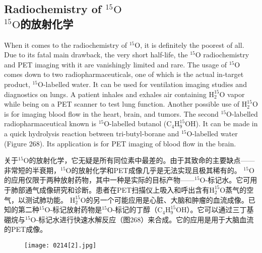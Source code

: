\documentclass[dvipsnames, svgnames,a4paper,11pt]{article}
\begin{document}
\subsection{Radiochemistry of \(\mathrm{^{15}O}\)\\ \(\mathrm{^{15}O}\)的放射化学}  
When it comes to the radiochemistry of \(\mathrm{^{15}O}\), it is definitely the poorest of all. Due to its fatal main drawback, the very short half-life, the \(\mathrm{^{15}O}\) radiochemistry and PET imaging with it are vanishingly limited and rare. The usage of \(\mathrm{^{15}O}\) comes down to two radiopharmaceuticals, one of which is the actual in-target product, \(\mathrm{^{15}O}\)-labelled water. It can be used for ventilation imaging studies and diagnostics on lungs. A patient inhales and exhales air containing \(\mathrm{H_{2}^{15}O}\) vapor while being on a PET scanner to test lung function. Another possible use of \(\mathrm{H_{2}^{15}O}\) is for imaging blood flow in the heart, brain, and tumors. The second \(\mathrm{^{15}O}\)-labelled radiopharmaceutical known is \(\mathrm{^{15}O}\)-labelled butanol (\(\mathrm{C_4H_9^{15}OH}\)). It can be made in a quick hydrolysis reaction between tri-butyl-borane and \(\mathrm{^{15}O}\)-labelled water (Figure 268). Its application is for PET imaging of blood flow in the brain.

关于\(\mathrm{^{15}O}\)的放射化学，它无疑是所有同位素中最差的。由于其致命的主要缺点——非常短的半衰期，\(\mathrm{^{15}O}\)的放射化学和PET成像几乎是无法实现且极其稀有的。 \(\mathrm{^{15}O}\)的应用仅限于两种放射药物，其中一种是实际的目标产物——\(\mathrm{^{15}O}\)-标记水。它可用于肺部通气成像研究和诊断。患者在PET扫描仪上吸入和呼出含有\(\mathrm{H_2^{15}O}\)蒸气的空气，以测试肺功能。 \(\mathrm{H_2^{15}O}\)的另一个可能应用是心脏、大脑和肿瘤的血流成像。已知的第二种\(\mathrm{^{15}O}\)-标记放射药物是\(\mathrm{^{15}O}\)-标记的丁醇（\(\mathrm{C_4H_9^{15}OH}\)）。它可以通过三丁基硼烷与\(\mathrm{^{15}O}\)-标记水进行快速水解反应（图268）来合成。它的应用是用于大脑血流的PET成像。

\begin{figure}[h]
	\centering
    \texttt{[image: 0214[2].jpg]}  
     \label{fig268}
\end{figure}

\newpage
\end{document}
